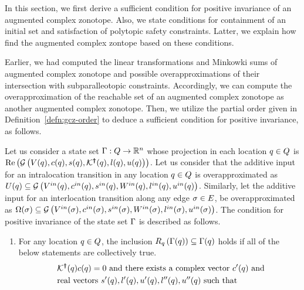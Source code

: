 In this section, we first derive a sufficient condition for positive
invariance of an augmented complex zonotope.  Also, we state
conditions for containment of an initial set and satisfaction of
polytopic safety constraints.  Latter, we explain how find the
augmented complex zontope based on these conditions.

Earlier, we had computed the linear transformations and Minkowki sums
of augmented complex zonotope and possible overapproximations of their
intersection with subparalleotopic constraints.  Accordingly, we can
compute the overapproximation of the reachable set of an augmented
complex zonotope as another augmented complex zonotope.  Then, we
utilize the partial order given in Definition~\ref{defn:gcz-order} to
  deduce a sufficient condition for positive invariance, as follows.
%
\begin{lemma}
  Let us consider a state set $\Gamma:Q\rightarrow\mathbb{R}^n$
  whose projection in each location $q\in Q$ is
  $\operatorname{\operatorname{Re}}\left(\mathcal{G}\left(V(q),c(q),s(q),\mathcal{K}^{\bm{\dagger}}(q),l(q),u(q)\right)\right)$.
  Let us consider that the additive input for an intralocation
  transition in any location $q\in Q$ is overapproximated
  as $U(q)\subseteq
  \mathcal{G}\left(V^{in}(q),c^{in}(q),s^{in}(q),W^{in}(q),l^{in}(q),u^{in}(q)\right)$.
  Similarly, let the additive input for an interlocation transition
  along any edge $\sigma\in E$, be overapproximated as
  $\Omega(\sigma)\subseteq
  \mathcal{G}\left(V^{in}(\sigma),c^{in}(\sigma),s^{in}(\sigma),W^{in}(\sigma),l^{in}(\sigma),u^{in}(\sigma)\right)$.
  The condition for positive invariance of the state set $\Gamma$
  is described as follows.
\begin{enumerate}
\item For any location $q\in Q$, the inclusion
  $R_{q}\left(\Gamma(q)\right)\subseteq
  \Gamma(q)$ holds if all of the below statements are
  collectively true.
\begin{align}~\label{eqn:locinv}
\begin{split}
& \mathcal{K}^{\bm{\dagger}}(q)c(q) = 0~\text{and there exists a complex vector}~
  c^\prime(q)~\text{and}\\
& \text{real
    vectors}~s^\prime(q),l^\prime(q),u^\prime(q),l^{\prime\prime}(q),u^{\prime\prime}(q)~\text{such
    that}\\
\end{split}
\end{align}
\vspace{-1.5em}

\end{enumerate}
\end{lemma}
